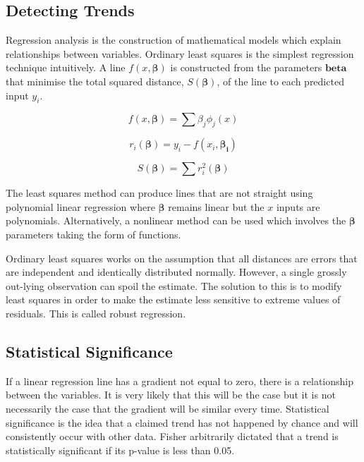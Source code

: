 		\subsection{Detecting Trends}
			Regression analysis is the construction of mathematical models which explain relationships between variables. Ordinary least squares is the simplest regression technique intuitively. A line $f(x,\mathbf{\beta})$ is constructed from the parameters $\mathbf{beta}$ that minimise the total squared distance, $S(\mathbf{\beta})$, of the line to each predicted input $y_i$\cite{regression_analysis_seber}. 
			
			\begin{equation}\label{equ:param}
				f(x,\mathbf{\beta}) = \sum \beta_j \phi_j(x)
			\end{equation}
			
			\begin{equation}\label{equ:regdistance}
				r_i(\mathbf{\beta}) = y_i - f(x_i,\mathbf{\beta_i})
			\end{equation}
			
			\begin{equation}\label{equ:regsum}
				S(\mathbf{\beta}) = \sum r^2_i(\mathbf{\beta})
			\end{equation}

			The least squares method can produce lines that are not straight using polynomial linear regression where $\mathbf{\beta}$ remains linear but the $x$ inputs are polynomials. Alternatively, a nonlinear method can be used which involves the $\mathbf{\beta}$ parameters taking the form of functions\cite{nonlinear_regression_motulsky}.
			
			Ordinary least squares works on the assumption that all distances are errors that are independent and identically distributed normally. However, a single grossly out-lying observation can spoil the estimate\cite{robust_regression_huber}. The solution to this is to modify least squares in order to make the estimate less sensitive to extreme values of residuals. This is called robust regression.				\subsection{Statistical Significance}
			If a linear regression line has a gradient not equal to zero, there is a relationship between the variables. It is very likely that this will be the case but it is not necessarily the case that the gradient will be similar every time. Statistical significance is the idea that a claimed trend has not happened by chance and will consistently occur with other data. Fisher arbitrarily dictated that a trend is statistically significant if its p-value is less than 0.05\cite{stats_research_fisher}.
			
